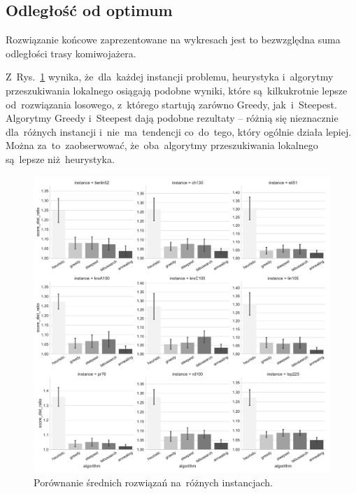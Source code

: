\subsection{Odległość od optimum}

Rozwiązanie końcowe zaprezentowane na wykresach jest to bezwzględna suma odległości trasy komiwojażera.

Z~Rys.~\ref{fig:avg} wynika, że~dla~każdej instancji problemu, heurystyka i~algorytmy przeszukiwania lokalnego osiągają podobne wyniki, które są~kilkukrotnie lepsze od~rozwiązania losowego, z~którego startują zarówno Greedy, jak~i~Steepest. Algorytmy Greedy i~Steepest dają podobne rezultaty -- różnią się nieznacznie dla~różnych instancji i~nie~ma~tendencji co~do~tego, który ogólnie działa lepiej. Można za~to~zaobserwować, że~oba~algorytmy przeszukiwania lokalnego są~lepsze niż~heurystyka.

\begin{figure}[H]
\begin{center}
\includegraphics[width=1.0\textwidth]{graphs/score_comparison_bar_avg.pdf}
\end{center}
\caption{Porównanie średnich rozwiązań na~różnych instancjach.}
\label{fig:avg}
\end{figure}


